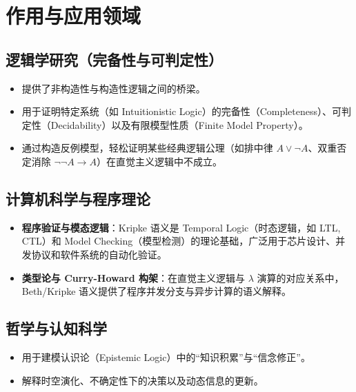 \documentclass[UTF8,a4paper,11pt]{ctexart}
\begin{document}
\section{作用与应用领域}

\subsection{逻辑学研究（完备性与可判定性）}

\begin{itemize}[leftmargin=2em]
  \item 提供了非构造性与构造性逻辑之间的桥梁。
  \item 用于证明特定系统（如 Intuitionistic Logic）的完备性（Completeness）、可判定性（Decidability）以及有限模型性质（Finite Model Property）。
  \item 通过构造反例模型，轻松证明某些经典逻辑公理（如排中律 $A \lor \neg A$、双重否定消除 $\neg\neg A \to A$）在直觉主义逻辑中不成立。
\end{itemize}

\subsection{计算机科学与程序理论}

\begin{itemize}[leftmargin=2em]
  \item \textbf{程序验证与模态逻辑}：Kripke 语义是 Temporal Logic（时态逻辑，如 LTL, CTL）和 Model Checking（模型检测）的理论基础，广泛用于芯片设计、并发协议和软件系统的自动化验证。
  \item \textbf{类型论与 Curry-Howard 构架}：在直觉主义逻辑与 $\lambda$ 演算的对应关系中，Beth/Kripke 语义提供了程序并发分支与异步计算的语义解释。
\end{itemize}

\subsection{哲学与认知科学}

\begin{itemize}[leftmargin=2em]
  \item 用于建模认识论（Epistemic Logic）中的“知识积累”与“信念修正”。
  \item 解释时空演化、不确定性下的决策以及动态信息的更新。
\end{itemize}
\end{document}
